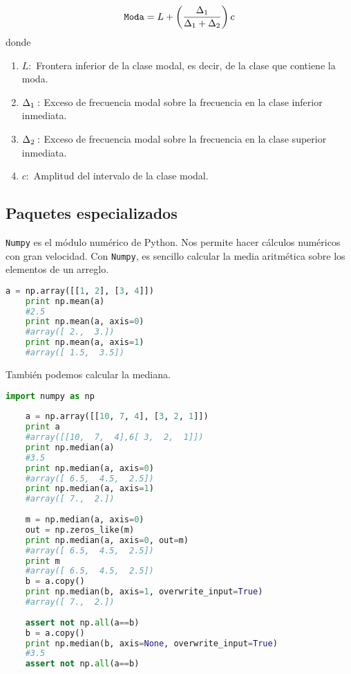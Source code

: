 \begin{definicion}
	\begin{align}
		\texttt{Moda}=
		L + \left( \dfrac{\Delta_{1}}{\Delta_{1}+\Delta_{2}} \right)c
	\end{align}
	donde 
	\begin{enumerate}
		\item $L:$ Frontera inferior de la clase modal, es decir, de la clase que contiene la moda.
		\item $\Delta_{1}:$ Exceso de frecuencia modal sobre la frecuencia en la clase inferior inmediata. 
		\item $\Delta_{2}:$ Exceso de frecuencia modal sobre la frecuencia en la clase superior inmediata. 
		\item $c:$ Amplitud del intervalo de la clase modal.
	\end{enumerate}
	
\end{definicion}



\subsection{Paquetes especializados}

\texttt{Numpy} es el módulo numérico de Python. Nos permite hacer cálculos numéricos con gran velocidad. Con \texttt{Numpy}, es sencillo calcular  la media aritmética sobre los elementos de un arreglo.

\begin{lstlisting}[language=Python]
	a = np.array([[1, 2], [3, 4]])
	print np.mean(a)
	#2.5
	print np.mean(a, axis=0)
	#array([ 2.,  3.])
	print np.mean(a, axis=1)
	#array([ 1.5,  3.5])
\end{lstlisting}


También podemos calcular la mediana.
\begin{lstlisting}[language=Python]
	import numpy as np
	
	a = np.array([[10, 7, 4], [3, 2, 1]])
	print a
	#array([[10,  7,  4],6[ 3,  2,  1]])
	print np.median(a)
	#3.5
	print np.median(a, axis=0)
	#array([ 6.5,  4.5,  2.5])
	print np.median(a, axis=1)
	#array([ 7.,  2.])
	
	m = np.median(a, axis=0)
	out = np.zeros_like(m)
	print np.median(a, axis=0, out=m)
	#array([ 6.5,  4.5,  2.5])
	print m
	#array([ 6.5,  4.5,  2.5])
	b = a.copy()
	print np.median(b, axis=1, overwrite_input=True)
	#array([ 7.,  2.])
	
	assert not np.all(a==b)
	b = a.copy()
	print np.median(b, axis=None, overwrite_input=True)
	#3.5
	assert not np.all(a==b)
\end{lstlisting}

